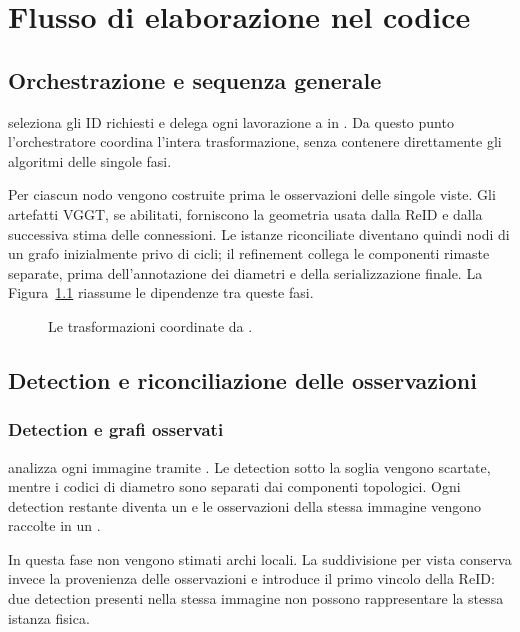 \chapter{Flusso di elaborazione nel codice}
\label{chap:flusso-codice}

\section{Orchestrazione e sequenza generale}

 seleziona gli ID richiesti e delega ogni lavorazione a
 in . Da
questo punto l'orchestratore coordina l'intera trasformazione, senza contenere
direttamente gli algoritmi delle singole fasi.

Per ciascun nodo vengono costruite prima le osservazioni delle singole viste.
Gli artefatti VGGT, se abilitati, forniscono la geometria usata dalla ReID e
dalla successiva stima delle connessioni. Le istanze riconciliate diventano
quindi nodi di un grafo inizialmente privo di cicli; il refinement collega le
componenti rimaste separate, prima dell'annotazione dei diametri e della
serializzazione finale. La Figura~\ref{fig:pipeline-code-flow} riassume le
dipendenze tra queste fasi.

\begin{figure}[H]
  \centering
  \resizebox{\textwidth}{!}{}
  \caption{Le trasformazioni coordinate da .}
  \label{fig:pipeline-code-flow}
\end{figure}

\section{Detection e riconciliazione delle osservazioni}

\subsection{Detection e grafi osservati}

 analizza ogni immagine tramite
. Le detection sotto la soglia vengono
scartate, mentre i codici di diametro sono separati dai componenti topologici.
Ogni detection restante diventa un  e le osservazioni della
stessa immagine vengono raccolte in un .

In questa fase non vengono stimati archi locali. La suddivisione per vista
conserva invece la provenienza delle osservazioni e introduce il primo vincolo
della ReID: due detection presenti nella stessa immagine non possono
rappresentare la stessa istanza fisica.

